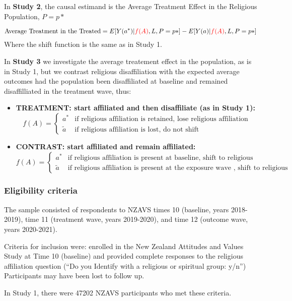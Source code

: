 \documentclass[
  singlecolumn]{article}
\begin{document}
In \textbf{Study 2}, the causal estimand is the Average Treatment Effect
in the Religious Population, \(P = p*\)

\[ \text{Average Treatment in the Treated} = E[Y(a^*)|\textcolor{red}{f(A)},L, P=p*] -  E[Y(a)|\textcolor{red}{f(A)},L, P=p*] \]
Where the shift function is the same as in Study 1.

In \textbf{Study 3} we investigate the average treatement effect in the
population, as is in Study 1, but we contrast religious disaffiliation
with the expected average outcomes had the population been disaffiliated
at baseline and remained disaffilliated in the treatment wave, thus:

\begin{itemize}
\item
  \textbf{TREATMENT: start affiliated and then disaffiliate (as in Study
  1):} \[
   f(A) = \begin{cases} a^* & \text{if religious affiliation is retained, lose religious affiliation} \\ 
   \tilde{a} & \text{if religious affiliation is lost, do not shift} \end{cases}
   \]
\item
  \textbf{CONTRAST: start affiliated and remain affiliated:} \[
   f(A) = \begin{cases} a^* & \text{if religious affiliation is present at baseline, shift to religious disaffiliation} \\ 
   \tilde{a} & \text{if religious affiliation is present at the exposure wave , shift to religious disaffiliation} \end{cases}
   \]
\end{itemize}

\subsubsection{Eligibility criteria}\label{eligibility-criteria}

The sample consisted of respondents to NZAVS times 10 (baseline, years
2018-2019), time 11 (treatment wave, years 2019-2020), and time 12
(outcome wave, years 2020-2021).

Criteria for inclusion were: enrolled in the New Zealand Attitudes and
Values Study at Time 10 (baseline) and provided complete responses to
the religious affiliation question (``Do you Identify with a religious
or spiritual group: y/n'') Participants may have been lost to follow up.

In Study 1, there were 47202 NZAVS participants who met these criteria.
\end{document}
